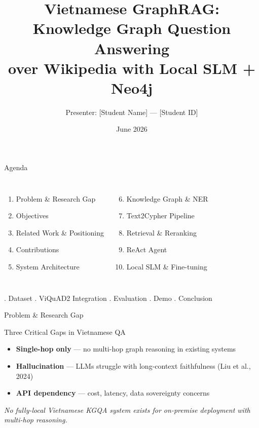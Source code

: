 \documentclass[aspectratio=169]{beamer}
\title{Vietnamese GraphRAG: Knowledge Graph Question Answering\\over Wikipedia with Local SLM + Neo4j}
\author{Presenter: [Student Name] --- [Student ID]}
\institute{FPT University}
\date{June 2026}
\begin{document}
\begin{frame}[plain]
\titlepage
\end{frame}

\begin{frame}{Agenda}
\begin{columns}[T]
\begin{enumerate}
  \item Problem \& Research Gap
  \item Objectives
  \item Related Work \& Positioning
  \item Contributions
  \item System Architecture
\end{enumerate}
\begin{enumerate}
  \setcounter{enumi}{5}
  \item Knowledge Graph \& NER
  \item Text2Cypher Pipeline
  \item Retrieval \& Reranking
  \item ReAct Agent
  \item Local SLM \& Fine-tuning
\end{enumerate}
\end{columns}
\vspace{0.5em}
. Dataset . ViQuAD2 Integration . Evaluation . Demo . Conclusion
\end{frame}

\begin{frame}{Problem \& Research Gap}
\begin{alertblock}{Three Critical Gaps in Vietnamese QA}
\begin{itemize}
  \item \textbf{Single-hop only} --- no multi-hop graph reasoning in existing systems
  \item \textbf{Hallucination} --- LLMs struggle with long-context faithfulness (Liu et al., 2024)
  \item \textbf{API dependency} --- cost, latency, data sovereignty concerns
\end{itemize}
\end{alertblock}
\vspace{0.3em}
\textit{No fully-local Vietnamese KGQA system exists for on-premise deployment with multi-hop reasoning.}
\end{frame}
\end{document}
